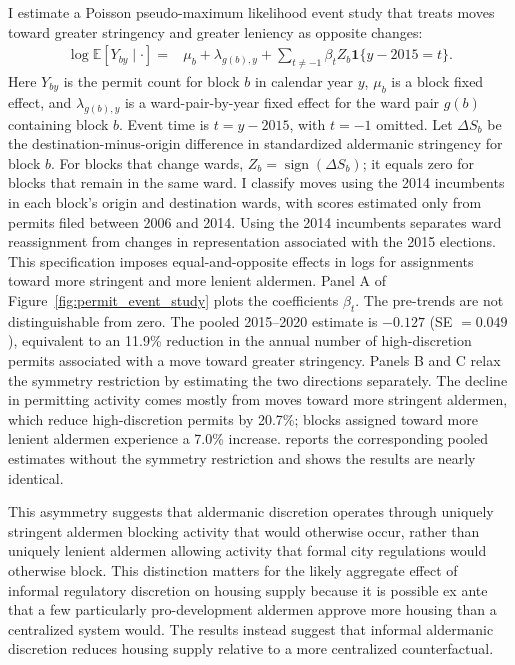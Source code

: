 I estimate a Poisson pseudo-maximum likelihood event study that treats moves toward greater stringency and greater leniency as opposite changes:
%
\begin{equation}
\label{eq:event_study_permits}
\begin{aligned}
\log \mathbb{E}[Y_{by}\mid\cdot] ={}&
\mu_b + \lambda_{g(b),y}
+ \sum_{t \neq -1}
\beta_t Z_b \mathbf{1}\{y-2015=t\}.
\end{aligned}
\end{equation}
%
Here $Y_{by}$ is the permit count for block $b$ in calendar year $y$, $\mu_b$ is a block fixed effect, and $\lambda_{g(b),y}$ is a ward-pair-by-year fixed effect for the ward pair $g(b)$ containing block $b$.
Event time is $t=y-2015$, with $t=-1$ omitted.
Let $\Delta S_b$ be the destination-minus-origin difference in standardized aldermanic stringency for block $b$.
For blocks that change wards, $Z_b=\operatorname{sign}(\Delta S_b)$; it equals zero for blocks that remain in the same ward.
I classify moves using the 2014 incumbents in each block's origin and destination wards, with scores estimated only from permits filed between 2006 and 2014.
Using the 2014 incumbents separates ward reassignment from changes in representation associated with the 2015 elections.
This specification imposes equal-and-opposite effects in logs for assignments toward more stringent and more lenient aldermen.
Panel A of Figure~\ref{fig:permit_event_study} plots the coefficients $\beta_t$.
The pre-trends are not distinguishable from zero.
The pooled 2015--2020 estimate is $-0.127$ (SE $=0.049$), equivalent to an 11.9\% reduction in the annual number of high-discretion permits associated with a move toward greater stringency.
Panels B and C relax the symmetry restriction by estimating the two directions separately.
The decline in permitting activity comes mostly from moves toward more stringent aldermen, which reduce high-discretion permits by 20.7\%; blocks assigned toward more lenient aldermen experience a 7.0\% increase.
 reports the corresponding pooled estimates without the symmetry restriction and shows the results are nearly identical.

This asymmetry suggests that aldermanic discretion operates through uniquely stringent aldermen blocking activity that would otherwise occur, rather than uniquely lenient aldermen allowing activity that formal city regulations would otherwise block.
This distinction matters for the likely aggregate effect of informal regulatory discretion on housing supply because it is possible ex ante that a few particularly pro-development aldermen approve more housing than a centralized system would.
The results instead suggest that informal aldermanic discretion reduces housing supply relative to a more centralized counterfactual.

